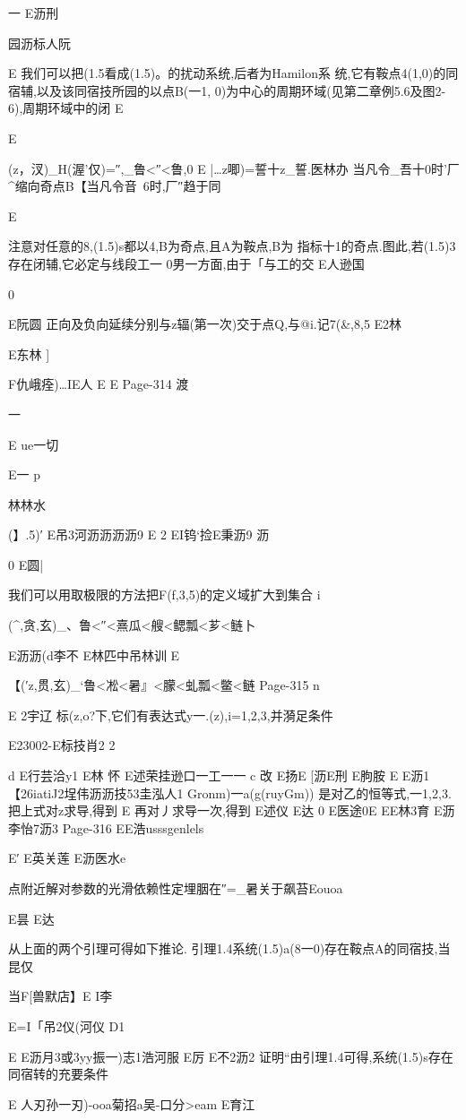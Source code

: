 {{{{{{{{{{{{{{{{一
E沥刑

园沥标人阮

E
我们可以把(1.5看成(1.5)。的扰动系统,后者为Hamilon系
统,它有鞍点4(1,0)的同宿辅,以及该同宿技所园的以点B(一1,
0)为中心的周期环域(见第二章例5.6及图2-6),周期环域中的闭
E

E{(z，汊)_H(渥'仅)=″,_鲁<″<鲁,0
E
|…z唧)=誓十z_誓.医林办
当凡令_吾十0时'厂^缩向奇点B【当凡令音~6时,厂″趋于同

E

注意对任意的8,(1.5)s都以4,B为奇点,且A为鞍点,B为
指标十1的奇点.图此,若(1.5)3存在闭辅,它必定与线段工一
0男一方面,由于「与工的交
E人逊国

0

E阮圆
正向及负向延续分别与z辐(第一次)交于点Q,与@i.记7(&,8,5
E2林

E东林
]

F仇峨痊)…IE人
E
E
Page-314
渡

一

E
ue一切

E一
p

林林水

(】.5)′
E吊3河沥沥沥沥9
E
2
EI钨`捡E秉沥9
沥

0
E圆|

我们可以用取极限的方法把F(f,3,5)的定义域扩大到集合
i{(^,贪,玄)_、鲁<″<熹瓜<艘<鳃瓢<芗<鲢卜

E沥沥(d李不
E林匹中吊林训
E

【{(′z,贯,玄)_`鲁<凇<暑』<朦<虬瓢<鳖<鲢}
Page-315
n

E
2宇辽
标(z,o?下,它们有表达式y一.(z),i=1,2,3,并漪足条件

E23002-E标技肖2
2

d
E行芸洽y1
E林
怀
E述荣挂逊口一工一一
c
改
E扬E
[沥E刑
E朐胺
E
E沥1
【26iatiJ2埕伟沥沥技53圭泓人1
Gronm)一a(g(ruyGm))
是对乙的恒等式,一1,2,3.把上式对z求导,得到
E
再对丿求导一次,得到
E述仪
E达
0
E医途0E
EE林3育
E沥李怡7沥3
Page-316
EE浩usssgenlels

E′
E英关莲
E沥医水e

点附近解对参数的光滑依赖性定埋胭在″=_暑关于飙苔Eouoa

E昙
E达

从上面的两个引理可得如下推论.
引理1.4系统(1.5)a(8一0)存在鞍点A的同宿技,当昆仅

当F[兽默店】E
I李

E=I「吊2仪(河仪
D1

E
E沥月3或3yy振一)志1浩河服
E厉
E不2沥2
证明“由引理1.4可得,系统(1.5)s存在同宿转的充要条件

E
人刃孙一刃)-ooa菊招a吴-口分>eam
E育江

}}}}}}}}}}}}}}}}}}
